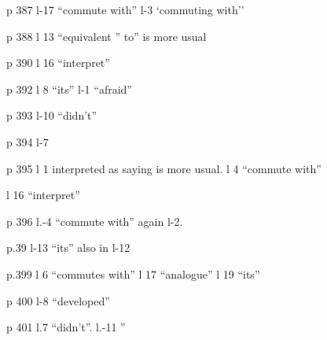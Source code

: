 p 387 l-17 ``commute with'' \quad l-3 `commuting with''

p 388 l 13 ``equivalent '' to'' is more usual

p 390 l 16 ``interpret''

p 392 l 8 ``its'' \quad l-1 ``afraid''

p 393 l-10 ``didn't''

p 394 l-7 

p 395 l 1 interpreted as saying is more usual. \quad l 4 ``commute with''

l 16 ``interpret''

p 396 l.-4 ``commute with'' again l-2. 

p.39 l-13 ``its'' also in l-12

p.399 l 6 ``commutes with'' \quad l 17 ``analogue'' \quad l 19 ``its''

p 400 l-8 ``developed''

p 401 l.7 ``didn't''. \quad l.-11 ''

